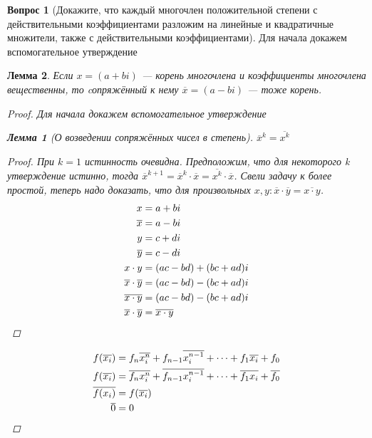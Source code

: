 \documentclass[a4paper,11pt]{article}
\newtheorem*{lemma}{Лемма}
\theoremstyle{remark}
\theoremstyle{definition}
\newtheorem{question}{Вопрос}
\numberwithin{question}{subsection}
\begin{document}
\begin{question}[Докажите, что каждый многочлен положительной степени с действительными коэффициентами разложим на линейные и квадратичные множители, также с действительными коэффициентами]
Для начала докажем вспомогательное утверждение
\begin{lemma}
Если \(x = (a + bi)\) --- корень многочлена и коэффициенты многочлена вещественны, то cопряжённый к нему \(\overline{x} = (a - bi)\) --- тоже корень.
\begin{proof}
Для начала докажем вспомогательное утверждение
\begin{lemma}[О возведении сопряжённых чисел в степень]
\(\overline{x}^k = \overline{x^k}\)
\begin{proof}
При \(k = 1\) истинность очевидна. Предположим, что для некоторого k утверждение истинно, тогда \(\overline{x}^{k+1}  = \overline{x}^k \cdot \overline{x} = \overline{x^k} \cdot \overline{x}\). Свели задачу к более простой, теперь надо доказать, что для произвольных \(x, y: \overline{x} \cdot \overline{y} = \overline{x \cdot y}\).
\begin{align*}
	x &= a + bi \\
	\overline{x} &= a - bi \\
	y &= c + di \\
	\overline{y} &= c - di\\
	x \cdot y &= (ac - bd) + (bc + ad)i \\
	\overline{x} \cdot \overline{y} &= (ac - bd) - (bc + ad)i \\
	\overline{x \cdot y} &= (ac - bd) - (bc + ad)i \\
	\overline{x} \cdot \overline{y} &= \overline{x \cdot y} \qedhere
\end{align*}
\end{proof}
\end{lemma}

\begin{align*}
	f(\overline{x_i}) &= f_n\overline{x_i^n} + f_{n-1}\overline{x_i^{n-1}} + \dots + f_1\overline{x_i} + f_0 \\
	f(\overline{x_i}) &= \overline{f_nx_i^n} + \overline{f_{n-1}x_i^{n-1}} + \dots + \overline{f_1x_i} + \overline{f_0} \\
	\overline{f(x_i)} &= f(\overline{x_i}) \\
	\overline{0} &= 0 \qedhere
\end{align*}
\end{proof}
\end{lemma}


\end{question}
\end{document}

